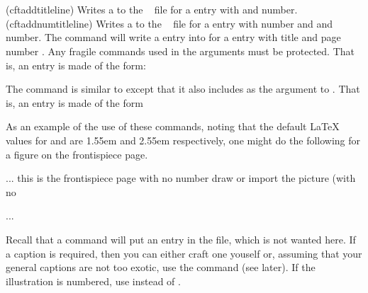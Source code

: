 \begin{syntax}
\cmd{\cftaddtitleline} \\
\cmd{\cftaddnumtitleline} \\
\end{syntax}
\glossary(cftaddtitleline)%
  {}%
  {Writes a  to the \listofx\  file for
   a  entry with  and  number.}
\glossary(cftaddnumtitleline)%
  {}%
  {Writes a  to the \listofx\  file for
   a  entry with number  and  and 
    number.}
 The command \cmd{\cftaddtitleline} 
 will write a \cmd{\contentsline} entry into  for a 
 entry with title  and page number . 
 Any fragile commands used in the arguments must be protected.
That is,
 an entry is made of the form: 
\begin{lcode}
\end{lcode}
 The command \cmd{\cftaddnumtitleline}
 is similar to \cmd{\cftaddtitleline} except that it also includes 
 as the argument to
 \cmd{\numberline}. That is, an entry is made of the form
\begin{lcode}
\end{lcode}

 As an example of the use of these commands, 
 noting that the default LaTeX values for 
 \cmd{\@pnumwidth} and \cmd{\@tocrmarg} are 1.55em and 2.55em respectively, 
 one might do the following for a figure on the 
frontispiece page.
 \begin{lcode}
 ...
  this is the frontispiece page with no number
  draw or import the picture (with no \caption)
 \clearpage
 ...
 \end{lcode}
    Recall that a \cmd{\caption} command will put an entry in the 
file, which is not wanted here. If a caption is required, 
then you can  either craft one youself or, assuming that your general 
captions are not too exotic, use the \cmd{\legend} command 
(see later). If the illustration is numbered, use 
\cmd{\cftaddnumtitleline} instead of \cmd{\cftaddtitleline}.


